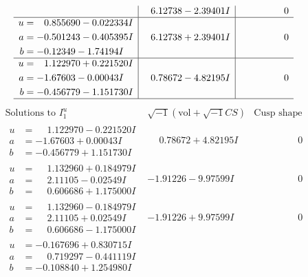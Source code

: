 \documentclass[1p]{elsarticle_modified}
\theoremstyle{definition}
\newcommand{\I}{\sqrt{-1}}
\begin{document}
$$\begin{array}{c|c|c}
 & \phantom{-}6.12738 - 2.39401 I & \phantom{-0.000000 } 0 \\ \hline\begin{aligned}
u &= \phantom{-}0.855690 - 0.022334 I \\
a &= -0.501243 - 0.405395 I \\
b &= -0.12349 - 1.74194 I\end{aligned}
 & \phantom{-}6.12738 + 2.39401 I & \phantom{-0.000000 } 0 \\ \hline\begin{aligned}
u &= \phantom{-}1.122970 + 0.221520 I \\
a &= -1.67603 - 0.00043 I \\
b &= -0.456779 - 1.151730 I\end{aligned}
 & \phantom{-}0.78672 - 4.82195 I & \phantom{-0.000000 } 0\\
 \hline 
 \end{array}$$\newpage$$\begin{array}{c|c|c}  
\text{Solutions to }I^u_{1}& \I (\text{vol} + \sqrt{-1}CS) & \text{Cusp shape}\\
 \hline 
\begin{aligned}
u &= \phantom{-}1.122970 - 0.221520 I \\
a &= -1.67603 + 0.00043 I \\
b &= -0.456779 + 1.151730 I\end{aligned}
 & \phantom{-}0.78672 + 4.82195 I & \phantom{-0.000000 } 0 \\ \hline\begin{aligned}
u &= \phantom{-}1.132960 + 0.184979 I \\
a &= \phantom{-}2.11105 - 0.02549 I \\
b &= \phantom{-}0.606686 + 1.175000 I\end{aligned}
 & -1.91226 - 9.97599 I & \phantom{-0.000000 } 0 \\ \hline\begin{aligned}
u &= \phantom{-}1.132960 - 0.184979 I \\
a &= \phantom{-}2.11105 + 0.02549 I \\
b &= \phantom{-}0.606686 - 1.175000 I\end{aligned}
 & -1.91226 + 9.97599 I & \phantom{-0.000000 } 0 \\ \hline\begin{aligned}
u &= -0.167696 + 0.830715 I \\
a &= \phantom{-}0.719297 - 0.441119 I \\
b &= -0.108840 + 1.254980 I\end{aligned}

\end{array}$$
\end{document}
